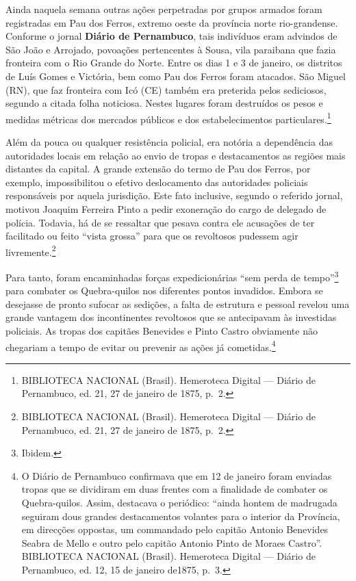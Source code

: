 \begin{refsection}
Ainda naquela semana outras ações perpetradas por grupos armados foram registradas em Pau dos Ferros, extremo oeste da província norte rio-grandense. Conforme o jornal \textbf{Diário de Pernambuco}, tais indivíduos eram advindos de São João e Arrojado, povoações pertencentes à Sousa, vila paraibana que fazia fronteira com o Rio Grande do Norte. Entre os dias 1 e 3 de janeiro, os distritos de Luís Gomes e Victória, bem como Pau dos Ferros foram atacados. São Miguel (RN), que faz fronteira com Icó (CE) também era preterida pelos sediciosos, segundo a citada folha noticiosa. Nestes lugares foram destruídos os pesos e medidas métricas dos mercados públicos e dos estabelecimentos particulares.\footnote{BIBLIOTECA NACIONAL (Brasil). Hemeroteca Digital --- Diário de Pernambuco, ed. 21, 27 de janeiro de 1875, p.~2.}

Além da pouca ou qualquer resistência policial, era notória a dependência das autoridades locais em relação ao envio de tropas e destacamentos as regiões mais distantes da capital. A grande extensão do termo de Pau dos Ferros, por exemplo, impossibilitou o efetivo deslocamento das autoridades policiais responsáveis por aquela jurisdição. Este fato inclusive, segundo o referido jornal, motivou Joaquim Ferreira Pinto a pedir exoneração do cargo de delegado de polícia. Todavia, há de se ressaltar que pesava contra ele acusações de ter facilitado ou feito “vista grossa” para que os revoltosos pudessem agir livremente.\footnote{BIBLIOTECA NACIONAL (Brasil). Hemeroteca Digital --- Diário de Pernambuco, ed. 21, 27 de janeiro de 1875, p.~2.}

Para tanto, foram encaminhadas forças expedicionárias “sem perda de tempo”\footnote{Ibidem.} para combater os Quebra-quilos nos diferentes pontos invadidos. Embora se desejasse de pronto sufocar as sedições, a falta de estrutura e pessoal revelou uma grande vantagem dos incontinentes revoltosos que se antecipavam às investidas policiais. As tropas dos capitães Benevides e Pinto Castro obviamente não chegariam a tempo de evitar ou prevenir as ações já cometidas.\footnote{O Diário de Pernambuco confirmava que em 12 de janeiro foram enviadas tropas que se dividiram em duas frentes com a finalidade de combater os Quebra-quilos. Assim, destacava o periódico: “ainda hontem de madrugada seguiram dous grandes destacamentos volantes para o interior da Província, em direcções oppostas, um commandado pelo capitão Antonio Benevides Seabra de Mello e outro pelo capitão Antonio Pinto de Moraes Castro”. BIBLIOTECA NACIONAL (Brasil). Hemeroteca Digital --- Diário de Pernambuco, ed. 12, 15 de janeiro de1875, p.~3.}


\end{refsection}

